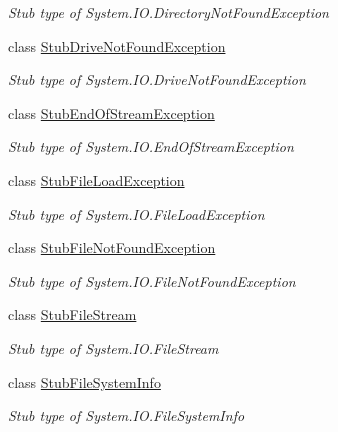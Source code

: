 \begin{DoxyCompactItemize}
\begin{DoxyCompactList}\small\item\em Stub type of System.\-I\-O.\-Directory\-Not\-Found\-Exception\end{DoxyCompactList}\item 
class \hyperlink{class_system_1_1_i_o_1_1_fakes_1_1_stub_drive_not_found_exception}{Stub\-Drive\-Not\-Found\-Exception}
\begin{DoxyCompactList}\small\item\em Stub type of System.\-I\-O.\-Drive\-Not\-Found\-Exception\end{DoxyCompactList}\item 
class \hyperlink{class_system_1_1_i_o_1_1_fakes_1_1_stub_end_of_stream_exception}{Stub\-End\-Of\-Stream\-Exception}
\begin{DoxyCompactList}\small\item\em Stub type of System.\-I\-O.\-End\-Of\-Stream\-Exception\end{DoxyCompactList}\item 
class \hyperlink{class_system_1_1_i_o_1_1_fakes_1_1_stub_file_load_exception}{Stub\-File\-Load\-Exception}
\begin{DoxyCompactList}\small\item\em Stub type of System.\-I\-O.\-File\-Load\-Exception\end{DoxyCompactList}\item 
class \hyperlink{class_system_1_1_i_o_1_1_fakes_1_1_stub_file_not_found_exception}{Stub\-File\-Not\-Found\-Exception}
\begin{DoxyCompactList}\small\item\em Stub type of System.\-I\-O.\-File\-Not\-Found\-Exception\end{DoxyCompactList}\item 
class \hyperlink{class_system_1_1_i_o_1_1_fakes_1_1_stub_file_stream}{Stub\-File\-Stream}
\begin{DoxyCompactList}\small\item\em Stub type of System.\-I\-O.\-File\-Stream\end{DoxyCompactList}\item 
class \hyperlink{class_system_1_1_i_o_1_1_fakes_1_1_stub_file_system_info}{Stub\-File\-System\-Info}
\begin{DoxyCompactList}\small\item\em Stub type of System.\-I\-O.\-File\-System\-Info\end{DoxyCompactList}\item 

\end{DoxyCompactItemize}
